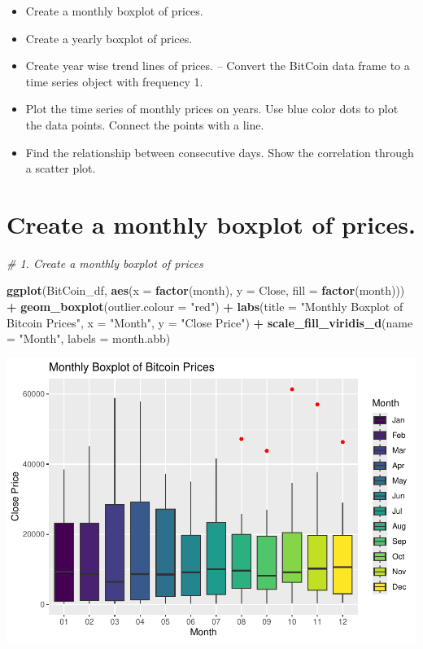 \documentclass[
]{book}
\newenvironment{Shaded}{\begin{snugshade}}{\end{snugshade}}
\newcommand{\AttributeTok}[1]{\textcolor[rgb]{0.13,0.29,0.53}{#1}}
\newcommand{\CommentTok}[1]{\textcolor[rgb]{0.56,0.35,0.01}{\textit{#1}}}
\newcommand{\FunctionTok}[1]{\textcolor[rgb]{0.13,0.29,0.53}{\textbf{#1}}}
\newcommand{\NormalTok}[1]{#1}
\newcommand{\SpecialCharTok}[1]{\textcolor[rgb]{0.81,0.36,0.00}{\textbf{#1}}}
\newcommand{\StringTok}[1]{\textcolor[rgb]{0.31,0.60,0.02}{#1}}
\providecommand{\tightlist}{%
  \setlength{\itemsep}{0pt}\setlength{\parskip}{0pt}}
\begin{document}
\begin{itemize}
\tightlist
\item
  Create a monthly boxplot of prices.
\item
  Create a yearly boxplot of prices.
\item
  Create year wise trend lines of prices.
  -- Convert the BitCoin data frame to a time series object with frequency 1.
\item
  Plot the time series of monthly prices on years. Use blue color dots to plot the data points. Connect the points with a line.
\item
  Find the relationship between consecutive days. Show the correlation through a scatter plot.
\end{itemize}

\section*{Create a monthly boxplot of prices.}\label{create-a-monthly-boxplot-of-prices.}

\begin{Shaded}
\begin{Highlighting}[]
\CommentTok{\# 1. Create a monthly boxplot of prices}

\FunctionTok{ggplot}\NormalTok{(BitCoin\_df, }\FunctionTok{aes}\NormalTok{(}\AttributeTok{x =} \FunctionTok{factor}\NormalTok{(month), }\AttributeTok{y =}\NormalTok{ Close, }\AttributeTok{fill =} \FunctionTok{factor}\NormalTok{(month))) }\SpecialCharTok{+}
  \FunctionTok{geom\_boxplot}\NormalTok{(}\AttributeTok{outlier.colour =} \StringTok{"red"}\NormalTok{) }\SpecialCharTok{+}
  \FunctionTok{labs}\NormalTok{(}\AttributeTok{title =} \StringTok{"Monthly Boxplot of Bitcoin Prices"}\NormalTok{, }\AttributeTok{x =} \StringTok{"Month"}\NormalTok{, }\AttributeTok{y =} \StringTok{"Close Price"}\NormalTok{) }\SpecialCharTok{+}
  \FunctionTok{scale\_fill\_viridis\_d}\NormalTok{(}\AttributeTok{name =} \StringTok{"Month"}\NormalTok{, }\AttributeTok{labels =}\NormalTok{ month.abb)}
\end{Highlighting}
\end{Shaded}

\includegraphics{bookdown-demo_files/figure-latex/unnamed-chunk-9-1.pdf}
\end{document}
